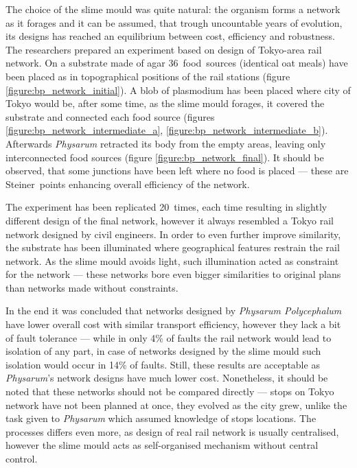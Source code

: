 The choice of the slime mould was quite natural: the organism forms a network as it forages and it can be assumed, that trough uncountable years of evolution, its designs has reached an equilibrium between cost, efficiency and robustness. The researchers prepared an experiment based on design of Tokyo-area rail network. On a substrate made of agar 36~food~sources (identical oat meals) have been placed as in topographical positions of the rail stations (figure \ref{figure:bp_network_initial}). A blob of plasmodium has been placed where city of Tokyo would be, after some time, as the slime mould forages, it covered the substrate and connected each food source (figures \ref{figure:bp_network_intermediate_a}, \ref{figure:bp_network_intermediate_b}). Afterwards \textit{Physarum} retracted its body from the empty areas, leaving only interconnected food sources (figure \ref{figure:bp_network_final}). It should be observed, that some junctions have been left where no food is placed --- these are Steiner~points \cite{kou1981fast} enhancing overall efficiency of the network.

The experiment has been replicated 20~times, each time resulting in slightly different design of the final network, however it always resembled a Tokyo rail network designed by civil engineers. In order to even further improve similarity, the substrate has been illuminated where geographical features restrain the rail network. As the slime mould avoids light, such illumination acted as constraint for the network --- these networks bore even bigger similarities to original plans than networks made without constraints. 

In the end it was concluded that networks designed by \textit{Physarum Polycephalum} have lower overall cost with similar transport efficiency, however they lack a bit of fault tolerance --- while in only 4\% of faults the rail network would lead to isolation of any part, in case of networks designed by the slime mould such isolation would occur in 14\% of faults. Still, these results are acceptable as \textit{Physarum}'s network designs have much lower cost. Nonetheless, it should be noted that these networks should not be compared directly --- stops on Tokyo network have not been planned at once, they evolved as the city grew, unlike the task given to \textit{Physarum} which assumed knowledge of stops locations. The processes differs even more, as design of real rail network is usually centralised, however the slime mould acts as self-organised mechanism without central control.


